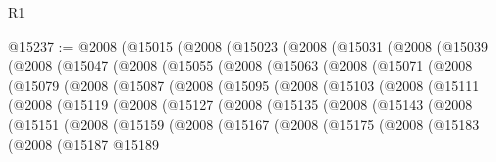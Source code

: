 \begin{lexlean}{R1}
\begin{coremodule}
@15237 := @2008
    (@15015
      (@2008
        (@15023
          (@2008
            (@15031
              (@2008
                (@15039
                  (@2008
                    (@15047
                      (@2008
                        (@15055
                          (@2008
                            (@15063
                              (@2008
                                (@15071
                                  (@2008
                                    (@15079
                                      (@2008
                                        (@15087
                                          (@2008
                                            (@15095
                                              (@2008
                                                (@15103
                                                  (@2008
                                                    (@15111
                                                      (@2008
                                                        (@15119
                                                          (@2008
                                                            (@15127
                                                              (@2008
                                                                (@15135
                                                                  (@2008
                                                                    (@15143
                                                                      (@2008
                                                                        (@15151
                                                                          (@2008
                                                                            (@15159
                                                                              (@2008
                                                                                (@15167
                                                                                  (@2008
                                                                                    (@15175
                                                                                      (@2008
                                                                                        (@15183
                                                                                          (@2008
                                                                                            (@15187
                                                                                              @15189

\end{coremodule}
\end{lexlean}
